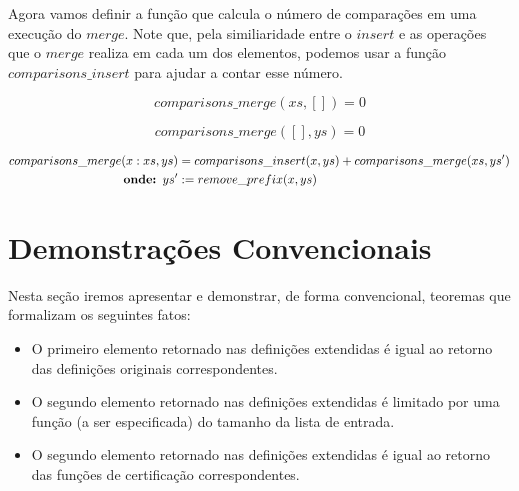 \documentclass[12pt, oneside, a4paper,english,brazil]{abntex2}
\begin{document}
\qquad Agora vamos definir a fun\c{c}\~ao que calcula o n\'umero de compara\c{c}\~oes em uma execu\c{c}\~ao
do $merge$. Note que, pela similiaridade entre
o $insert$ e as opera\c{c}\~oes que o $merge$ realiza em cada um dos elementos,
podemos usar a fun\c{c}\~ao $comparisons\_insert$ para ajudar a contar esse n\'umero.

\begin{equation} \label{comp_merge_base_1}
  comparisons\_merge(xs, []) = 0
\end{equation}

\begin{equation} \label{comp_merge_base_2}
  comparisons\_merge([], ys) = 0
\end{equation}

\begin{equation} \label{comp_merge_ind}
  \begin{split}
  comparisons\_merge(x : xs, ys) &= comparisons\_insert(x, ys) + comparisons\_merge(xs, ys')\\
  \text{\textbf{onde: }} ys' &:= remove\_prefix(x, ys)
  \end{split}
\end{equation}


\chapter{Demonstra\c{c}\~oes Convencionais}

Nesta se\c{c}\~ao iremos apresentar e demonstrar, de forma convencional, teoremas que formalizam os seguintes fatos:
\begin{itemize}
  \item O primeiro elemento retornado nas defini\c{c}\~oes extendidas \'e igual ao retorno das defini\c{c}\~oes originais correspondentes.
  \item O segundo elemento retornado nas defini\c{c}\~oes extendidas \'e limitado por uma fun\c{c}\~ao (a ser especificada) do tamanho da lista de entrada.
  \item O segundo elemento retornado nas defini\c{c}\~oes extendidas \'e igual ao retorno das fun\c{c}\~oes de certifica\c{c}\~ao correspondentes.
\end{itemize}
\end{document}
